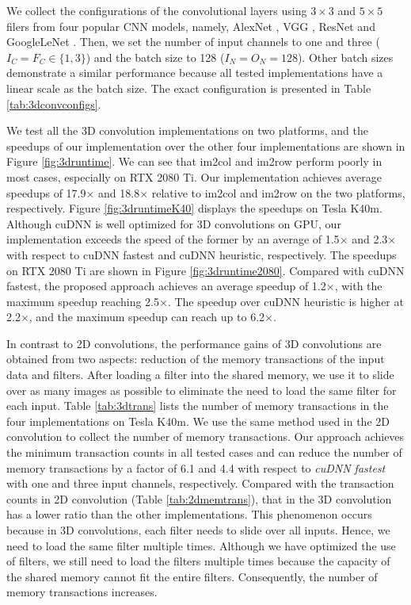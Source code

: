 We collect the configurations of the convolutional layers using $3 \times 3$ and $5 \times 5$ filers from four popular CNN models,
namely, AlexNet \cite{Krizhevsky2012ImageNet}, VGG \cite{SimonyanZ14a}, ResNet \cite{HeZRS16} and GoogleLeNet \cite{SzegedyLJSRAEVR15}.
Then, we set the number of input channels to one and three ($I_C=F_C \in \{1, 3\}$) and the batch size to 128 ($I_N=O_N=128$). Other batch
sizes demonstrate a similar performance because all tested implementations have a linear scale as the batch size. The exact configuration is presented in Table \ref{tab:3dconvconfigs}.

We test all the 3D convolution implementations on two platforms, and the speedups of our implementation over the other four implementations are shown
in Figure \ref{fig:3druntime}. We can see that im2col and im2row perform poorly in most cases, especially on RTX 2080 Ti. Our
implementation achieves average speedups of 17.9$\times$ and 18.8$\times$ relative to im2col and im2row on the two platforms, respectively. Figure \ref{fig:3druntimeK40} displays the speedups on Tesla K40m. Although cuDNN is well optimized for 3D convolutions on GPU, our implementation exceeds the speed of the former by an average of 1.5$\times$ and 2.3$\times$ with respect to cuDNN fastest and cuDNN heuristic, respectively. The speedups on RTX 2080 Ti are shown in Figure \ref{fig:3druntime2080}. Compared with cuDNN fastest, the proposed approach achieves an average speedup of 1.2$\times$, with the maximum speedup reaching 2.5$\times$. The speedup over cuDNN heuristic is higher at 2.2$\times$, and the maximum speedup can reach up to 6.2$\times$.

In contrast to 2D convolutions, the performance gains of 3D convolutions are obtained from two aspects: reduction of the memory transactions of the input data and filters. After loading a filter into the shared memory, we use it to slide over as many images as possible to eliminate the need to load the same filter for each input. Table \ref{tab:3dtrans} lists the number of memory transactions in the four implementations on Tesla K40m. We use the same method used in the 2D convolution to collect the number of memory transactions. Our approach achieves
the minimum transaction counts in all tested cases and can reduce the number of memory transactions by a factor of 6.1 and 4.4
with respect to \emph{cuDNN fastest} with one and three input channels, respectively. Compared with the transaction counts in 2D convolution (Table \ref{tab:2dmemtrans}), that in the 3D convolution has a lower ratio than the other implementations. This phenomenon occurs because in 3D convolutions, each filter needs to slide over all inputs. Hence, we need to load the same filter multiple times. Although we have optimized the use of filters, we still need to load the filters multiple times because the capacity of the shared memory cannot fit the entire
filters. Consequently, the number of memory transactions increases.

